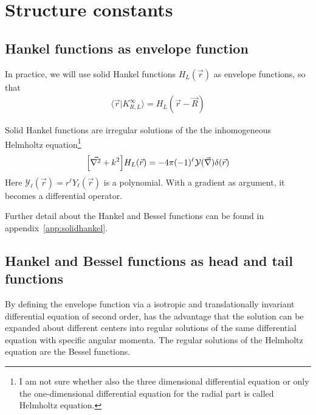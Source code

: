 \documentclass[11pt,a4paper]{report}
\begin{document}
\section{Structure constants}
\subsection{Hankel functions as envelope function}
In practice, we will use solid Hankel functions $H_L(\vec{r})$ as
envelope functions, so that 
\begin{eqnarray}
\langle\vec{r}|K^\infty_{R,L}\rangle= H_L(\vec{r}-\vec{R})
\end{eqnarray}

Solid Hankel functions are irregular solutions of the the
inhomogeneous Helmholtz equation\footnote{I am not sure whether also
  the three dimensional differential equation or only the
  one-dimensional differential equation for the radial part is called
  Helmholtz equation.}
\begin{eqnarray}
\Bigl[\vec{\nabla^2}+k^2\Bigr]H_{L}(\vec{r})
=-4\pi(-1)^\ell\mathcal{Y}(\vec{\nabla})\delta(\vec{r})
\label{eq:solidhelmholtzequation}
\end{eqnarray}
Here $\mathcal{Y}_\ell(\vec{r})=r^\ell Y_\ell(\vec{r})$ is a
polynomial. With a gradient as argument, it becomes a differential
operator.

Further detail about the Hankel and Bessel functions can be found in
appendix~\ref{app:solidhankel}.

\subsection{Hankel and Bessel functions as head and tail functions}
By defining the envelope function via a isotropic and translationally
invariant differential equation of second order, has the advantage
that the solution can be expanded about different centers into regular
solutions of the same differential equation with specific angular
momenta. The regular solutions of the Helmholtz equation are the
Bessel functions.
\end{document}

